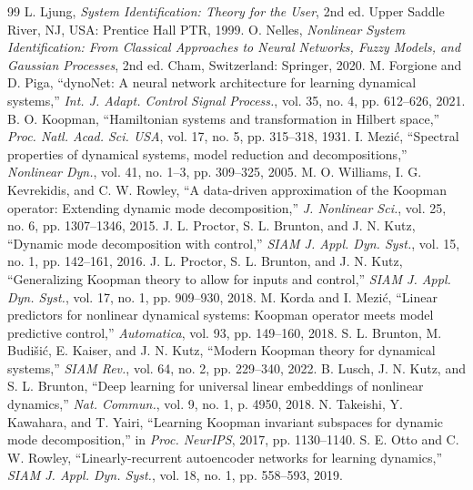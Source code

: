 \documentclass[journal]{IEEEtran}
\theoremstyle{plain}
\theoremstyle{definition}
\begin{document}
\begin{thebibliography}{99}
L. Ljung, \emph{System Identification: Theory for the User}, 2nd ed. Upper Saddle River, NJ, USA: Prentice Hall PTR, 1999.
O. Nelles, \emph{Nonlinear System Identification: From Classical Approaches to Neural Networks, Fuzzy Models, and Gaussian Processes}, 2nd ed. Cham, Switzerland: Springer, 2020.
M. Forgione and D. Piga, ``dynoNet: A neural network architecture for learning dynamical systems,'' \emph{Int. J. Adapt. Control Signal Process.}, vol. 35, no. 4, pp. 612--626, 2021.
B. O. Koopman, ``Hamiltonian systems and transformation in Hilbert space,'' \emph{Proc. Natl. Acad. Sci. USA}, vol. 17, no. 5, pp. 315--318, 1931.
I. Mezi\'c, ``Spectral properties of dynamical systems, model reduction and decompositions,'' \emph{Nonlinear Dyn.}, vol. 41, no. 1--3, pp. 309--325, 2005.
M. O. Williams, I. G. Kevrekidis, and C. W. Rowley, ``A data-driven approximation of the Koopman operator: Extending dynamic mode decomposition,'' \emph{J. Nonlinear Sci.}, vol. 25, no. 6, pp. 1307--1346, 2015.
J. L. Proctor, S. L. Brunton, and J. N. Kutz, ``Dynamic mode decomposition with control,'' \emph{SIAM J. Appl. Dyn. Syst.}, vol. 15, no. 1, pp. 142--161, 2016.
J. L. Proctor, S. L. Brunton, and J. N. Kutz, ``Generalizing Koopman theory to allow for inputs and control,'' \emph{SIAM J. Appl. Dyn. Syst.}, vol. 17, no. 1, pp. 909--930, 2018.
M. Korda and I. Mezi\'c, ``Linear predictors for nonlinear dynamical systems: Koopman operator meets model predictive control,'' \emph{Automatica}, vol. 93, pp. 149--160, 2018.
S. L. Brunton, M. Budi\v{s}i\'c, E. Kaiser, and J. N. Kutz, ``Modern Koopman theory for dynamical systems,'' \emph{SIAM Rev.}, vol. 64, no. 2, pp. 229--340, 2022.
B. Lusch, J. N. Kutz, and S. L. Brunton, ``Deep learning for universal linear embeddings of nonlinear dynamics,'' \emph{Nat. Commun.}, vol. 9, no. 1, p. 4950, 2018.
N. Takeishi, Y. Kawahara, and T. Yairi, ``Learning Koopman invariant subspaces for dynamic mode decomposition,'' in \emph{Proc. NeurIPS}, 2017, pp. 1130--1140.
S. E. Otto and C. W. Rowley, ``Linearly-recurrent autoencoder networks for learning dynamics,'' \emph{SIAM J. Appl. Dyn. Syst.}, vol. 18, no. 1, pp. 558--593, 2019.

\end{thebibliography}
\end{document}
